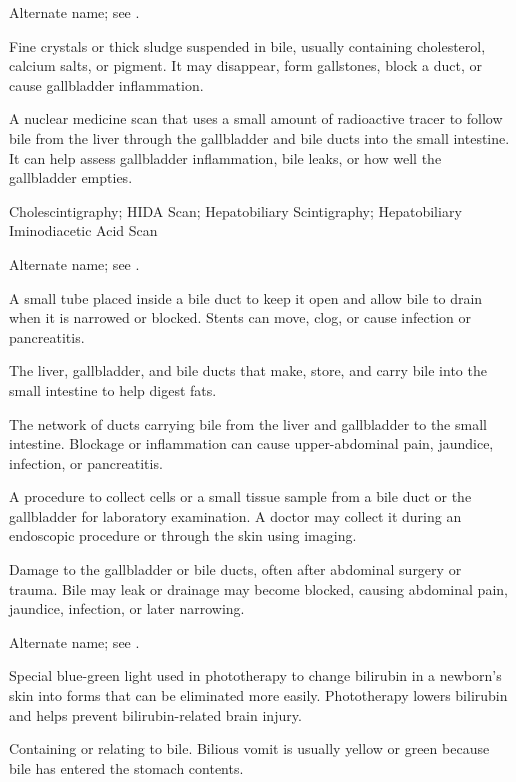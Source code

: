  Alternate name; see .

 Fine crystals or thick sludge suspended in bile, usually containing cholesterol, calcium salts, or pigment. It may disappear, form gallstones, block a duct, or cause gallbladder inflammation.

 A nuclear medicine scan that uses a small
amount of radioactive tracer to follow bile from the liver through the
gallbladder and bile ducts into the small intestine. It can help assess
gallbladder inflammation, bile leaks, or how well the gallbladder empties.

\synonyms
Cholescintigraphy; HIDA Scan; Hepatobiliary Scintigraphy; Hepatobiliary Iminodiacetic Acid Scan

 Alternate name; see .

 A small tube placed inside a bile duct to keep it open and allow bile to drain when it is narrowed or blocked. Stents can move, clog, or cause infection or pancreatitis.

 The liver, gallbladder, and bile ducts that make, store, and carry bile into the small intestine to help digest fats.

 The network of ducts carrying bile from the liver and gallbladder to the small intestine. Blockage or inflammation can cause upper-abdominal pain, jaundice, infection, or pancreatitis.

 A procedure to collect cells or a small
tissue sample from a bile duct or the gallbladder for laboratory examination.
A doctor may collect it during an endoscopic procedure or through the skin
using imaging.

 Damage to the gallbladder or bile ducts, often after abdominal surgery or trauma. Bile may leak or drainage may become blocked, causing abdominal pain, jaundice, infection, or later narrowing.

 Alternate name; see .

 Special blue-green light used in phototherapy to change bilirubin in a newborn’s skin into forms that can be eliminated more easily. Phototherapy lowers bilirubin and helps prevent bilirubin-related brain injury.

 Containing or relating to bile. Bilious vomit is usually yellow or green because bile has entered the stomach contents.

